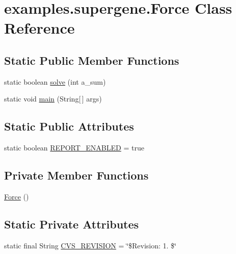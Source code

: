 \hypertarget{classexamples_1_1supergene_1_1_force}{\section{examples.\-supergene.\-Force Class Reference}
\label{classexamples_1_1supergene_1_1_force}
}
\subsection*{Static Public Member Functions}
\begin{DoxyCompactItemize}
\item 
static boolean \hyperlink{classexamples_1_1supergene_1_1_force_a258314b6f36e5440651b3f4521a8e4bf}{solve} (int a\-\_\-sum)
\item 
static void \hyperlink{classexamples_1_1supergene_1_1_force_a695696a6c87a667f4a46fedd355a1b1f}{main} (String\mbox{[}$\,$\mbox{]} args)
\end{DoxyCompactItemize}
\subsection*{Static Public Attributes}
\begin{DoxyCompactItemize}
\item 
static boolean \hyperlink{classexamples_1_1supergene_1_1_force_a1f3ab7a80a1419be7862d341e3ca63f9}{R\-E\-P\-O\-R\-T\-\_\-\-E\-N\-A\-B\-L\-E\-D} = true
\end{DoxyCompactItemize}
\subsection*{Private Member Functions}
\begin{DoxyCompactItemize}
\item 
\hyperlink{classexamples_1_1supergene_1_1_force_a40669a830a5e5572cd4b53bd807e69b1}{Force} ()
\end{DoxyCompactItemize}
\subsection*{Static Private Attributes}
\begin{DoxyCompactItemize}
\item 
static final String \hyperlink{classexamples_1_1supergene_1_1_force_a45d7e2ec1456b983d9f67e3ca925fd06}{C\-V\-S\-\_\-\-R\-E\-V\-I\-S\-I\-O\-N} = \char`\"{}\$Revision\-: 1. \$\char`\"{}
\end{DoxyCompactItemize}



